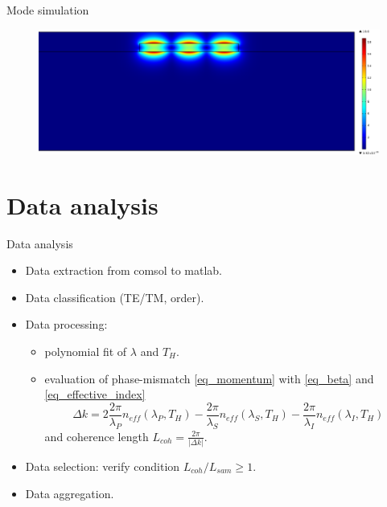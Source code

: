 \documentclass[11pt, leqno]{beamer}
\begin{document}
\begin{frame}{Mode simulation}
	\begin{figure}
		\centering
		\includegraphics[width=\textwidth]{output_modeTM.pdf}
	\end{figure}
\end{frame}
\section{Data analysis}
\begin{frame}{Data analysis}
	\begin{itemize}
	\item	Data extraction from comsol to matlab.
	\item	Data classification (TE/TM, order).
	\item	Data processing:\\
			\begin{itemize}
			\item	polynomial fit of $\lambda$ and $T_H$.
			\item	evaluation of phase-mismatch \eqref{eq_momentum} with \eqref{eq_beta} and \eqref{eq_effective_index}
					\begin{equation}
					\Delta k = 2	 \frac{2\pi}{ \lambda_P } n_{eff}(\lambda_P,T_H)
								-\frac{2\pi}{ \lambda_S } n_{eff}(\lambda_S,T_H)
								-\frac{2\pi}{ \lambda_I } n_{eff}(\lambda_I,T_H)
					\end{equation}
					and coherence length $L_{coh} = \frac{2\pi}{|\Delta k|}$.
			\end{itemize}
	\item	Data selection: verify condition $L_{coh}/L_{sam} \geq 1$.
	\item	Data aggregation.
	\end{itemize}
\end{frame}
\end{document}
